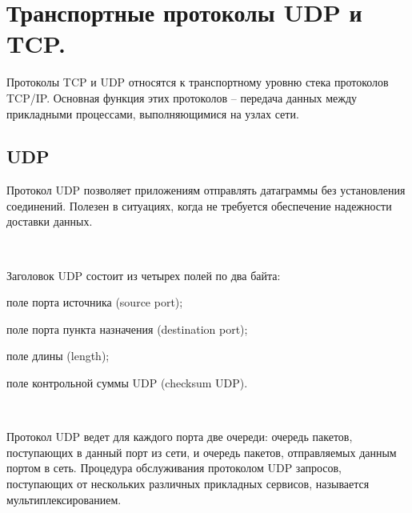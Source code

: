 \documentclass{article}
\begin{document}
\section{\textbf{\large Транспортные протоколы UDP и TCP.}}

Протоколы TCP и UDP относятся к транспортному уровню стека протоколов TCP/IP.
Основная функция этих протоколов – передача данных между прикладными
процессами, выполняющимися на узлах сети.

\subsection{\textbf{UDP}}

Протокол UDP позволяет приложениям отправлять датаграммы без установления соединений. 
Полезен в ситуациях, когда не требуется обеспечение надежности доставки данных. 

~\

Заголовок UDP состоит из четырех полей по два байта:
\begin{compactitem}
\item  поле порта источника (source port);
\item поле порта пункта назначения (destination port);
\item поле длины (length);
\item поле контрольной суммы UDP (checksum UDP).
\end{compactitem}

~\

Протокол UDP ведет для каждого порта две очереди: очередь пакетов, поступающих в данный порт из сети, и очередь пакетов, отправляемых данным портом в сеть. 
Процедура обслуживания протоколом UDP запросов, поступающих от нескольких различных прикладных сервисов, называется мультиплексированием. 
\end{document}
